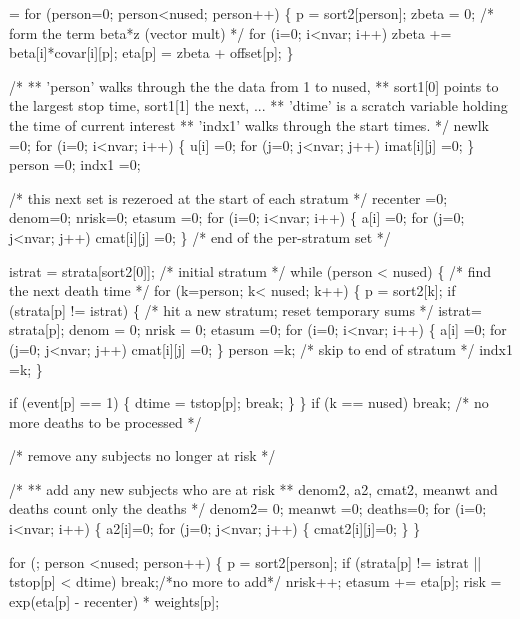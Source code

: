 \documentclass{article}
\begin{document}
\begin{nwchunk}
=
 for (person=0; person<nused; person++) \{
     p = sort2[person];
     zbeta = 0;      /* form the term beta*z   (vector mult) */
     for (i=0; i<nvar; i++)
         zbeta += beta[i]*covar[i][p];
     eta[p] = zbeta + offset[p];
 \}
 
 /*
 **  'person' walks through the the data from 1 to nused,
 **     sort1[0] points to the largest stop time, sort1[1] the next, ...
 **  'dtime' is a scratch variable holding the time of current interest
 **  'indx1' walks through the start times.  
 */
 newlk =0;
 for (i=0; i<nvar; i++) \{
     u[i] =0;
     for (j=0; j<nvar; j++) imat[i][j] =0;
 \}
 person =0;
 indx1 =0;
 
 /* this next set is rezeroed at the start of each stratum */
 recenter =0;
 denom=0;
 nrisk=0;
 etasum =0;
 for (i=0; i<nvar; i++) \{
     a[i] =0;
     for (j=0; j<nvar; j++) cmat[i][j] =0;
 \}
 /* end of the per-stratum set */
 
 istrat = strata[sort2[0]];  /* initial stratum */
 while (person < nused) \{
     /* find the next death time */
     for (k=person; k< nused; k++) \{
         p = sort2[k];
         if (strata[p] != istrat) \{
             /* hit a new stratum; reset temporary sums */
             istrat= strata[p];
             denom = 0;
             nrisk = 0;
             etasum =0;
             for (i=0; i<nvar; i++) \{
                 a[i] =0;
                 for (j=0; j<nvar; j++) cmat[i][j] =0;
             \}
             person =k;  /* skip to end of stratum */
             indx1  =k; 
         \}
 
         if (event[p] == 1) \{
             dtime = tstop[p];
             break;
         \}
     \}
     if (k == nused) break;  /* no more deaths to be processed */
 
     /* remove any subjects no longer at risk */
 
     /* 
     ** add any new subjects who are at risk 
     ** denom2, a2, cmat2, meanwt and deaths count only the deaths
     */
     denom2= 0;
     meanwt =0;
     deaths=0;    
     for (i=0; i<nvar; i++) \{
         a2[i]=0;
         for (j=0; j<nvar; j++) \{
             cmat2[i][j]=0;
         \}
     \}
     
     for (; person <nused; person++) \{
         p = sort2[person];
         if (strata[p] != istrat || tstop[p] < dtime) break;/*no more to add*/
         nrisk++;
         etasum += eta[p];
         risk = exp(eta[p] - recenter) * weights[p];
         

\end{nwchunk}
\end{document}

